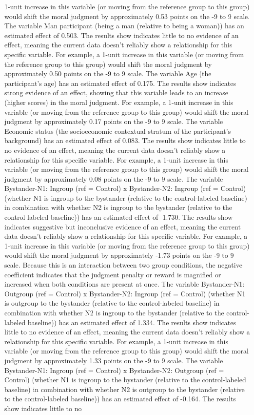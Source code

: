 \documentclass[11pt]{article}
\begin{document}
1-unit increase in this variable (or moving from the reference group to this group) would shift the moral judgment by approximately 0.53 points on the -9 to 9 scale. The variable Man participant (being a man (relative to being a woman)) has an estimated effect of 0.503. The results show indicates little to no evidence of an effect, meaning the current data doesn't reliably show a relationship for this specific variable. For example, a 1-unit increase in this variable (or moving from the reference group to this group) would shift the moral judgment by approximately 0.50 points on the -9 to 9 scale. The variable Age (the participant's age) has an estimated effect of 0.175. The results show indicates strong evidence of an effect, showing that this variable leads to an increase (higher scores) in the moral judgment. For example, a 1-unit increase in this variable (or moving from the reference group to this group) would shift the moral judgment by approximately 0.17 points on the -9 to 9 scale. The variable Economic status (the socioeconomic contextual stratum of the participant's background) has an estimated effect of 0.083. The results show indicates little to no evidence of an effect, meaning the current data doesn't reliably show a relationship for this specific variable. For example, a 1-unit increase in this variable (or moving from the reference group to this group) would shift the moral judgment by approximately 0.08 points on the -9 to 9 scale. The variable Bystander-N1: Ingroup (ref = Control) x Bystander-N2: Ingroup (ref = Control) (whether N1 is ingroup to the bystander (relative to the control-labeled baseline) in combination with whether N2 is ingroup to the bystander (relative to the control-labeled baseline)) has an estimated effect of -1.730. The results show indicates suggestive but inconclusive evidence of an effect, meaning the current data doesn't reliably show a relationship for this specific variable. For example, a 1-unit increase in this variable (or moving from the reference group to this group) would shift the moral judgment by approximately -1.73 points on the -9 to 9 scale. Because this is an interaction between two group conditions, the negative coefficient indicates that the judgment penalty or reward is magnified or increased when both conditions are present at once. The variable Bystander-N1: Outgroup (ref = Control) x Bystander-N2: Ingroup (ref = Control) (whether N1 is outgroup to the bystander (relative to the control-labeled baseline) in combination with whether N2 is ingroup to the bystander (relative to the control-labeled baseline)) has an estimated effect of 1.334. The results show indicates little to no evidence of an effect, meaning the current data doesn't reliably show a relationship for this specific variable. For example, a 1-unit increase in this variable (or moving from the reference group to this group) would shift the moral judgment by approximately 1.33 points on the -9 to 9 scale. The variable Bystander-N1: Ingroup (ref = Control) x Bystander-N2: Outgroup (ref = Control) (whether N1 is ingroup to the bystander (relative to the control-labeled baseline) in combination with whether N2 is outgroup to the bystander (relative to the control-labeled baseline)) has an estimated effect of -0.164. The results show indicates little to no 
\end{document}
